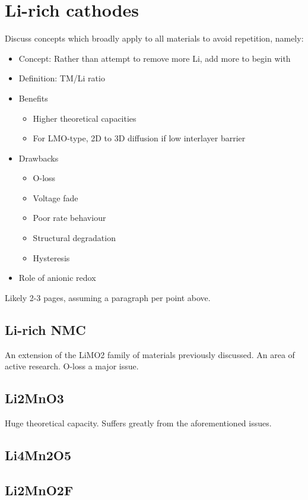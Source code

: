 \section{Li-rich cathodes}
Discuss concepts which broadly apply to all materials to avoid repetition, namely:
\begin{itemize}
	\item Concept: Rather than attempt to remove more Li, add more to begin with
	\item Definition: TM/Li ratio
	\item Benefits
	\begin{itemize}
		\item Higher theoretical capacities
		\item For LMO-type, 2D to 3D diffusion if low interlayer barrier\cite{Shin2016}
	\end{itemize}
	\item Drawbacks
	\begin{itemize}
	\item O-loss
	\item Voltage fade
	\item Poor rate behaviour
	\item Structural degradation
	\item Hysteresis
	\end{itemize}
	\item Role of anionic redox\cite{Yahia2019}
	\end{itemize}
Likely 2-3 pages, assuming a paragraph per point above.
\subsection{Li-rich NMC}
An extension of the LiMO2 family of materials previously discussed.
An area of active research.
O-loss a major issue.

\subsection{Li2MnO3}
Huge theoretical capacity.
Suffers greatly from the aforementioned issues.


\subsection{Li4Mn2O5}
\citet{Bhandari2019,Diaz-Lopez2017,Diaz-Lopez2018}
\subsection{Li2MnO2F}
\citet{Chen2015,Dambournet2018,Kim2015,House2018,Urban2014}

